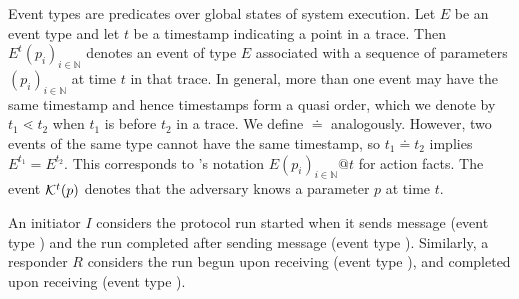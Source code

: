 Event types are predicates over global states of system execution.
%
Let $E$ be an event type and let $t$ be a timestamp indicating a point in a
trace.
%
Then $E^{t}(p_i)_{i\in\mathbb{N}}$ denotes an event of type $E$ associated with a sequence of parameters
$(p_i)_{i\in\mathbb{N}}$ at time $t$ in that trace.
%
In general, more than one event may have the same timestamp and hence
timestamps form a quasi order, which we denote by $t_1 \lessdot t_2$ when $t_1$
is before $t_2$ in a trace.
%
We define $\doteq$ analogously.
%
However, two events of the same type cannot have the same timestamp, so
$t_1 \doteq t_2$ implies $E^{t_1} = E^{t_2}$.
%
This corresponds to \mTamarin{}'s notation $E(p_i)_{i\in\mathbb{N}}@t$ for action facts.
%
%
%
%
The event $\mathcal{K}^t(p)$ denotes that the adversary knows a parameter $p$ at
time $t$.
%
%

An initiator $I$ considers the
protocol run started when it sends message \mMsgone{} (event type \mIStart)
and the run completed after sending message \mMsgthree{} (event type
\mIComplete).
%
%
Similarly, a responder $R$ considers the run begun upon receiving
\mMsgone{} (event type \mRStart), and completed upon receiving \mMsgthree{}
(event type \mRComplete). \\
%
%
%

